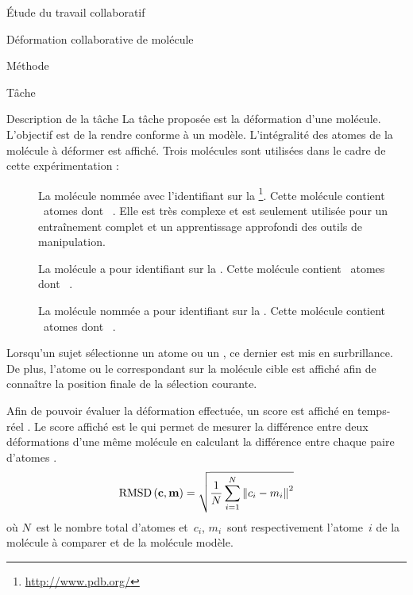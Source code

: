 \documentclass[myfrancais]{mythesis}
\begin{document}
\begin{mypart}{Étude du travail collaboratif}
\begin{mychapter}{Déformation collaborative de molécule}
\begin{mysection}{Méthode}
\begin{mysubsection}{Tâche}
					\begin{mysubsubsection}{Description de la tâche}
						La tâche proposée est la déformation d'une molécule.
						L'objectif est de la rendre conforme à un modèle.
						L'intégralité des atomes de la molécule à déformer est affiché.
						Trois molécules sont utilisées dans le cadre de cette expérimentation :
						\begin{description}
							\item[\myPrion]
								La molécule nommée \myPrion {} avec l'identifiant \myPDB {} sur la \myPDBbase\footnote{\url{http://www.pdb.org/}}.
								Cette molécule contient ~atomes dont ~.
								Elle est très complexe et est seulement utilisée pour un entraînement complet et un apprentissage approfondi des outils de manipulation.
							\item[\myTRPZIPPER]
								La molécule \myTRPZIPPER {} a pour identifiant \myPDB {} sur la \myPDBbase\footnotemark[\value{footnote}].
								Cette molécule contient ~atomes dont ~.
							\item[\myTRPCAGE]
								La molécule nommée \myTRPCAGE {} a pour identifiant \myPDB {} sur la \myPDBbase\footnotemark[\value{footnote}].
								Cette molécule contient ~atomes dont ~.
						\end{description}

						Lorsqu'un sujet sélectionne un atome ou un , ce dernier est mis en surbrillance.
						De plus, l'atome ou le  correspondant sur la molécule cible est affiché afin de connaître la position finale de la sélection courante.

						Afin de pouvoir évaluer la déformation effectuée, un score est affiché en temps-réel .
						Le score affiché est le  qui permet de mesurer la différence entre deux déformations d'une même molécule en calculant la différence entre chaque paire d'atomes .
						\begin{equation}\label{equ-RMSD}
							\mathrm{RMSD}\left(\mathbf{c},\mathbf{m}\right) = \sqrt{\frac{1}{N}\sum_{i=1}^{N}\left\| c_i - m_i \right\|^2}
						\end{equation}
						où $N$~est le nombre total d'atomes et~$c_i$, $m_i$~sont respectivement l'atome~$i$ de la molécule à comparer et de la molécule modèle.


\end{mysubsubsection}
\end{mysubsection}
\end{mysection}
\end{mychapter}
\end{mypart}
\end{document}
